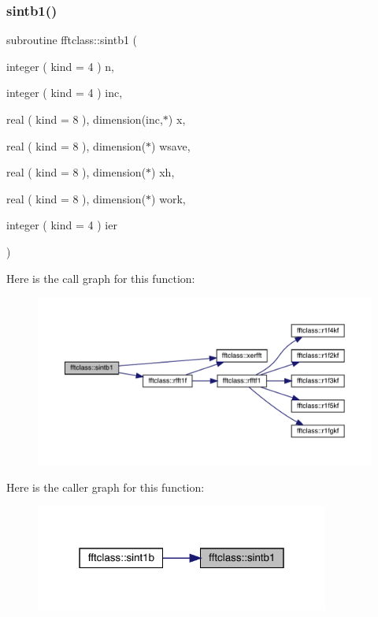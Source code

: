 \subsubsection{\texorpdfstring{sintb1()}{sintb1()}}
{\footnotesize\ttfamily subroutine fftclass\+::sintb1 (\begin{DoxyParamCaption}\item[{integer ( kind = 4 )}]{n,  }\item[{integer ( kind = 4 )}]{inc,  }\item[{real ( kind = 8 ), dimension(inc,$\ast$)}]{x,  }\item[{real ( kind = 8 ), dimension($\ast$)}]{wsave,  }\item[{real ( kind = 8 ), dimension($\ast$)}]{xh,  }\item[{real ( kind = 8 ), dimension($\ast$)}]{work,  }\item[{integer ( kind = 4 )}]{ier }\end{DoxyParamCaption})}

Here is the call graph for this function\+:\nopagebreak
\begin{figure}[H]
\begin{center}
\leavevmode
\includegraphics[width=350pt]{namespacefftclass_af29f41f086c8e8901df2716d0b86db20_cgraph}
\end{center}
\end{figure}
Here is the caller graph for this function\+:\nopagebreak
\begin{figure}[H]
\begin{center}
\leavevmode
\includegraphics[width=274pt]{namespacefftclass_af29f41f086c8e8901df2716d0b86db20_icgraph}
\end{center}
\end{figure}
\mbox{\label{namespacefftclass_aa79de4b10a068408990ac9ac8f32d134}} 
